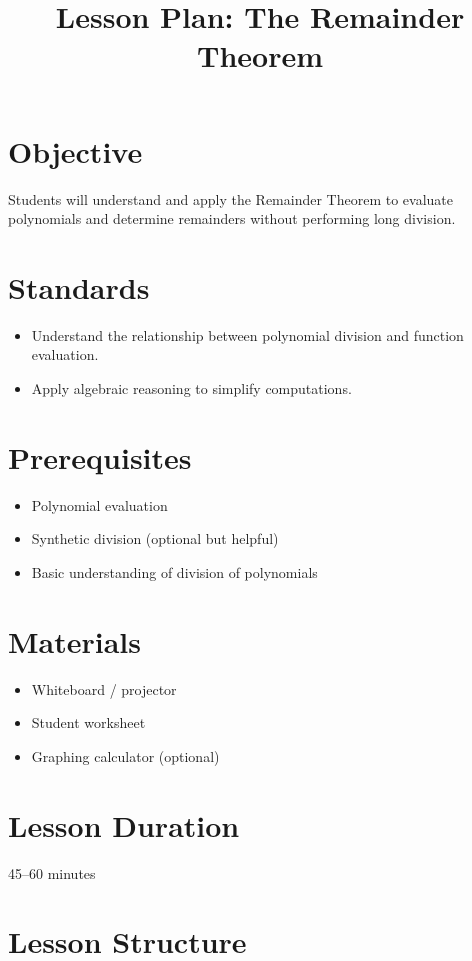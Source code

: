 \documentclass[10pt]{article}
\title{Lesson Plan: The Remainder Theorem}
\author{}
\date{}
\begin{document}
\maketitle

\section*{Objective}
Students will understand and apply the Remainder Theorem to evaluate polynomials and determine remainders without performing long division.

\section*{Standards}
\begin{itemize}
    \item Understand the relationship between polynomial division and function evaluation.
    \item Apply algebraic reasoning to simplify computations.
\end{itemize}

\section*{Prerequisites}
\begin{itemize}
    \item Polynomial evaluation
    \item Synthetic division (optional but helpful)
    \item Basic understanding of division of polynomials
\end{itemize}

\section*{Materials}
\begin{itemize}
    \item Whiteboard / projector
    \item Student worksheet
    \item Graphing calculator (optional)
\end{itemize}

\section*{Lesson Duration}
45--60 minutes

\section*{Lesson Structure}
\end{document}
